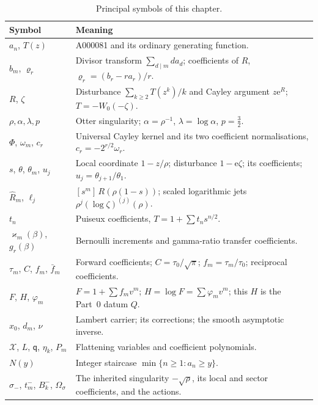 \documentclass[11pt,a4paper,oneside]{book}
\theoremstyle{plain}
\theoremstyle{definition}
\theoremstyle{remark}
\newcommand{\e}{\mathrm{e}}
\newcommand{\Coef}[1]{[#1]\,}
\newcommand{\Wlam}{W}
\begin{document}
\begin{table}[htbp]
\centering
\caption{Principal symbols of this chapter.}
\label{p1:tab:notation}
\small
\begin{tabular}{p{}p{}}
\toprule
Symbol & Meaning\\
\midrule
$a_n$, $T(z)$ & A000081 and its ordinary generating function.\\
$b_m$, $\varrho_r$ & Divisor transform $\sum_{d\mid m}da_d$; coefficients of $R$, $\varrho_r=(b_r-ra_r)/r$.\\
$R$, $\zeta$ & Disturbance $\sum_{k\ge2}T(z^{k})/k$ and Cayley argument $z\e^{R}$; $T=-\Wlam_0(-\zeta)$.\\
$\rho,\alpha,\lambda,p$ & Otter singularity; $\alpha=\rho^{-1}$, $\lambda=\log\alpha$, $p=\tfrac32$.\\
$\Phi$, $\omega_m$, $c_r$ & Universal Cayley kernel and its two coefficient normalisations, $c_r=-2^{r/2}\omega_r$.\\
$s$, $\theta$, $\theta_m$, $u_j$ & Local coordinate $1-z/\rho$; disturbance $1-\e\zeta$; its coefficients; $u_j=\theta_{j+1}/\theta_1$.\\
$\widehat R_m$, $\ell_j$ & $\Coef{s^m}R(\rho(1-s))$; scaled logarithmic jets $\rho^j(\log\zeta)^{(j)}(\rho)$.\\
$t_n$ & Puiseux coefficients, $T=1+\sum t_ns^{n/2}$.\\
$\varkappa_m(\beta)$, $g_r(\beta)$ & Bernoulli increments and gamma-ratio transfer coefficients.\\
$\tau_m$, $C$, $f_m$, $\bar f_m$ & Forward coefficients; $C=\tau_0/\sqrt\pi$; $f_m=\tau_m/\tau_0$; reciprocal coefficients.\\
$F$, $H$, $\varphi_m$ & $F=1+\sum f_mv^m$; $H=\log F=\sum\varphi_mv^m$; this $H$ is the Part~0 datum $Q$.\\
$x_0$, $d_m$, $\nu$ & Lambert carrier; its corrections; the smooth asymptotic inverse.\\
$\mathcal X$, $L$, $\mathsf q$, $\eta_k$, $P_m$ & Flattening variables and coefficient polynomials.\\
$N(y)$ & Integer staircase $\min\{n\ge1:a_n\ge y\}$.\\
$\sigma_-$, $t^-_m$, $B^-_k$, $\Omega_\sigma$ & The inherited singularity $-\sqrt\rho$, its local and sector coefficients, and the actions.\\
\bottomrule
\end{tabular}
\end{table}
\end{document}
